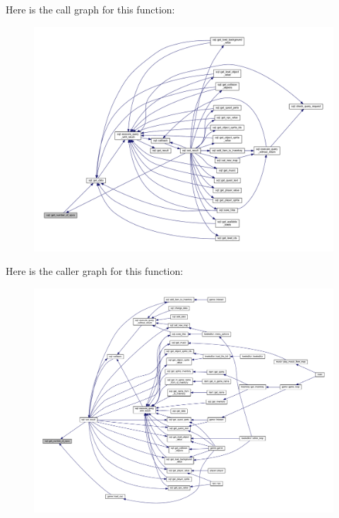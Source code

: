 Here is the call graph for this function\+:
\nopagebreak
\begin{figure}[H]
\begin{center}
\leavevmode
\includegraphics[width=350pt]{classsql_ae854372bac3fc5e681287e3cbf5b03de_cgraph}
\end{center}
\end{figure}
Here is the caller graph for this function\+:
\nopagebreak
\begin{figure}[H]
\begin{center}
\leavevmode
\includegraphics[width=350pt]{classsql_ae854372bac3fc5e681287e3cbf5b03de_icgraph}
\end{center}
\end{figure}
\mbox{\label{classsql_a0ea1aa772cb693be29da61c6cadffd86}} 
